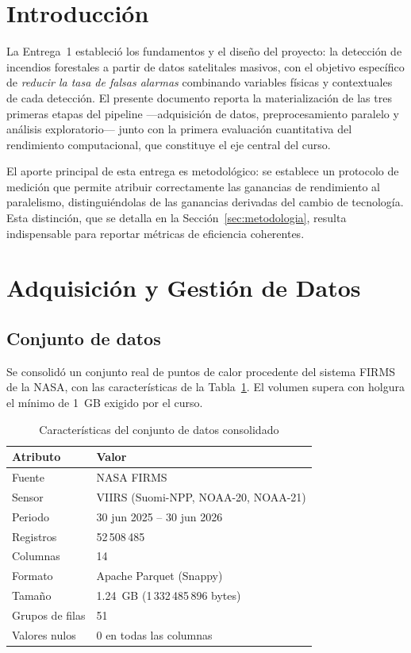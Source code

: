 \documentclass[conference]{IEEEtran}
\begin{document}
\section{Introducción}

La Entrega~1 estableció los fundamentos y el diseño del proyecto: la detección de incendios forestales a partir de datos satelitales masivos, con el objetivo específico de \textit{reducir la tasa de falsas alarmas} combinando variables físicas y contextuales de cada detección. El presente documento reporta la materialización de las tres primeras etapas del pipeline —adquisición de datos, preprocesamiento paralelo y análisis exploratorio— junto con la primera evaluación cuantitativa del rendimiento computacional, que constituye el eje central del curso.

El aporte principal de esta entrega es metodológico: se establece un protocolo de medición que permite atribuir correctamente las ganancias de rendimiento al paralelismo, distinguiéndolas de las ganancias derivadas del cambio de tecnología. Esta distinción, que se detalla en la Sección~\ref{sec:metodologia}, resulta indispensable para reportar métricas de eficiencia coherentes.

\section{Adquisición y Gestión de Datos}
\label{sec:datos}

\subsection{Conjunto de datos}
Se consolidó un conjunto real de puntos de calor procedente del sistema FIRMS de la NASA, con las características de la Tabla~\ref{tab:dataset}. El volumen supera con holgura el mínimo de 1~GB exigido por el curso.

\begin{table}[t]
\caption{Características del conjunto de datos consolidado}
\label{tab:dataset}
\centering
\renewcommand{\arraystretch}{1.25}
\begin{tabular}{p{2.6cm} p{4.9cm}}
\toprule
\textbf{Atributo} & \textbf{Valor} \\
\midrule
Fuente & NASA FIRMS \\
Sensor & VIIRS (Suomi-NPP, NOAA-20, NOAA-21) \\
Periodo & 30 jun 2025 -- 30 jun 2026 \\
Registros & 52\,508\,485 \\
Columnas & 14 \\
Formato & Apache Parquet (Snappy) \\
Tamaño & 1.24~GB (1\,332\,485\,896 bytes) \\
Grupos de filas & 51 \\
Valores nulos & 0 en todas las columnas \\
\bottomrule
\end{tabular}
\end{table}
\end{document}
